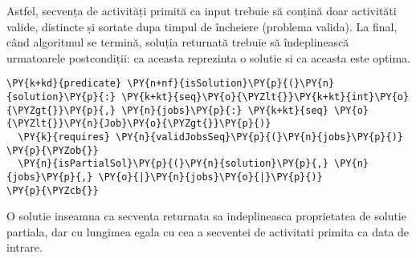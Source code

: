 Astfel, secvența de activități primită ca input trebuie să conțină doar activităti valide, distincte și sortate dupa timpul de încheiere (problema valida). 
La final, când algoritmul se termină, soluția returnată trebuie să îndeplinească urmatoarele postcondiții: ca aceasta reprezinta o solutie si ca aceasta este optima. 
\begin{Verbatim}[commandchars=\\\{\}, fontsize=\small]
\PY{k+kd}{predicate} \PY{n+nf}{isSolution}\PY{p}{(}\PY{n}{solution}\PY{p}{:} \PY{k+kt}{seq}\PY{o}{\PYZlt{}}\PY{k+kt}{int}\PY{o}{\PYZgt{}}\PY{p}{,} \PY{n}{jobs}\PY{p}{:} \PY{k+kt}{seq} \PY{o}{\PYZlt{}}\PY{n}{Job}\PY{o}{\PYZgt{}}\PY{p}{)}
  \PY{k}{requires} \PY{n}{validJobsSeq}\PY{p}{(}\PY{n}{jobs}\PY{p}{)}
\PY{p}{\PYZob{}}
  \PY{n}{isPartialSol}\PY{p}{(}\PY{n}{solution}\PY{p}{,} \PY{n}{jobs}\PY{p}{,} \PY{o}{|}\PY{n}{jobs}\PY{o}{|}\PY{p}{)}
\PY{p}{\PYZcb{}}
\end{Verbatim}
O solutie inseamna ca secventa returnata sa indeplineasca proprietatea de solutie partiala, dar cu lungimea egala cu cea a secventei de activitati primita ca data de intrare.

